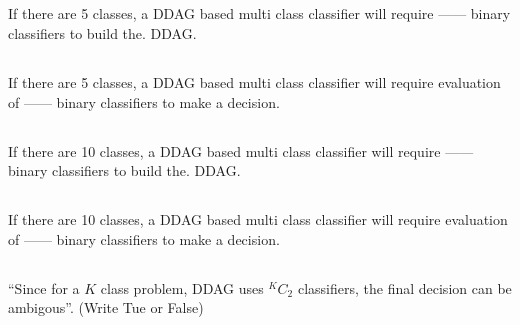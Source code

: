 \begin{frame}
\section{}
If there are 5 classes, a DDAG based multi class classifier will require ------ binary classifiers to build the. DDAG.


\end{frame}

\begin{frame}
\section{}
If there are 5 classes, a DDAG based multi class classifier will require evaluation of ------ binary classifiers to make a decision.


\end{frame}

\begin{frame}
\section{}
If there are 10 classes, a DDAG based multi class classifier will require ------ binary classifiers to build the. DDAG.


\end{frame}

\begin{frame}
\section{}
If there are 10 classes, a DDAG based multi class classifier will require evaluation of ------ binary classifiers to make a decision.


\end{frame}

\begin{frame}
\section{}
``Since for a $K$ class problem, DDAG uses $^KC_2$ classifiers, the final decision can be ambigous''. (Write Tue or False)
\end{frame}
